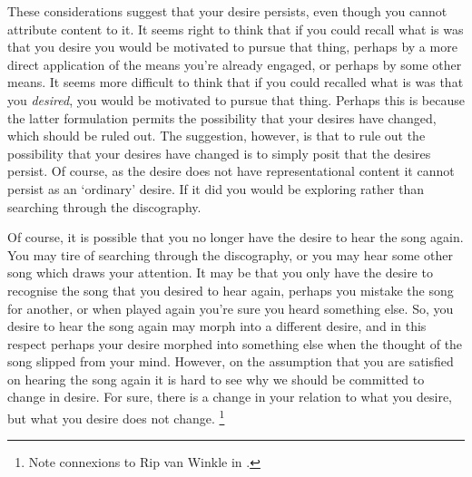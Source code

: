 \documentclass[10pt]{article}
\begin{document}
These considerations suggest that your desire persists, even though you cannot attribute content to it.
It seems right to think that if you could recall what is was that you desire you would be motivated to pursue that thing, perhaps by a more direct application of the means you're already engaged, or perhaps by some other means.
It seems more difficult to think that if you could recalled what is was that you \emph{desired}, you would be motivated to pursue that thing.
Perhaps this is because the latter formulation permits the possibility that your desires have changed, which should be ruled out.
The suggestion, however, is that to rule out the possibility that your desires have changed is to simply posit that the desires persist.
Of course, as the desire does not have representational content it cannot persist as an `ordinary' desire.
If it did you would be exploring rather than searching through the discography.

Of course, it is possible that you no longer have the desire to hear the song again.
You may tire of searching through the discography, or you may hear some other song which draws your attention.
It may be that you only have the desire to recognise the song that you desired to hear again, perhaps you mistake the song for another, or when played again you're sure you heard something else.
So, you desire to hear the song again may morph into a different desire, and in this respect perhaps your desire morphed into something else when the thought of the song slipped from your mind.
However, on the assumption that you are satisfied on hearing the song again it is hard to see why we should be committed to change in desire.
For sure, there is a change in your relation to what you desire, but what you desire does not change.\nolinebreak
\footnote{\color{red} Note connexions to Rip van Winkle in \textcite{Perry:1997aa}.}
\end{document}
